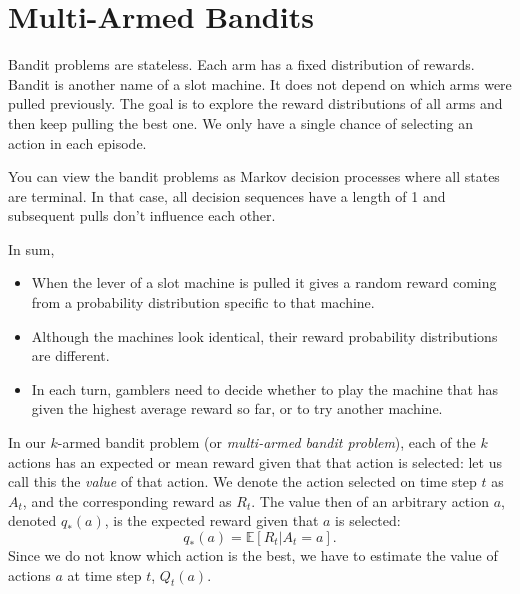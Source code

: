 \section{Multi-Armed Bandits}

Bandit problems are stateless. Each arm has a fixed distribution of rewards. Bandit is another name of a slot machine. It does not depend on which arms were pulled previously. The goal is to explore the reward distributions of all arms and then keep pulling the best one. We only have a single chance of selecting an action in each episode. 


You can view the bandit problems as Markov decision processes where all states are terminal. In that case, all decision sequences have a length of 1 and subsequent pulls don't influence each other.

In sum,
\begin{itemize}
	\item When the lever of a slot machine is pulled it gives a random reward coming from a probability distribution specific to that machine.
	\item Although the machines look identical, their reward probability distributions are different. 
	\item In each turn, gamblers need to decide whether to play the machine that has given the highest average reward so far, or to try another machine. 
\end{itemize}

In our $k$-armed bandit problem (or \textit{multi-armed bandit problem}), each of the $k$ actions has an expected or mean reward given that that action is selected: let us call this the \textit{value} of that action. We denote the action selected on time step $t$ as $A_t$, and the corresponding reward as $R_t$. The value then of an arbitrary action $a$, denoted $q_*(a)$, is the expected reward given that $a$ is selected:
$$q_*(a) = \mathbb{E}[R_t|A_t=a].$$
Since we do not know which action is the best, we have to estimate the value of actions $a$ at time step $t$, $Q_t(a)$.

